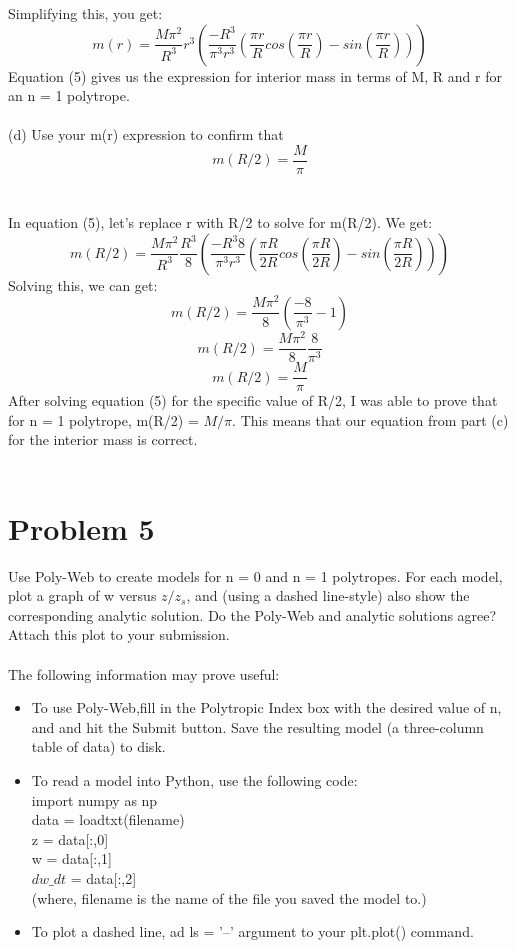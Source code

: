 \documentclass[10pt]{article}
\begin{document}
Simplifying this, you get:
\begin{equation}
    m(r) = \frac{M \pi^2}{R^3} r^3 \left( \frac{-R^3}{\pi^3 r^3} \left( \frac{\pi r }{R} cos(\frac{\pi r}{R}) - sin(\frac{\pi r}{R})\right) \right) \tag{5}
\end{equation}
Equation (5) gives us the expression for interior mass in terms of M, R and r for an n = 1 polytrope.
\\ \\
(d) Use your m(r) expression to confirm that 
\[ m(R/2) =  \frac{M}{\pi}\] \\ \\
In equation (5), let's replace r with R/2 to solve for m(R/2). We get:
\[ m(R/2) = \frac{M \pi^2}{R^3} \frac{R^3}{8} \left( \frac{-R^3 8}{\pi^3 r^3} \left( \frac{\pi R }{2R} cos(\frac{\pi R}{2R}) - sin(\frac{\pi R}{2R})\right) \right)\]
Solving this, we can get:
\[ m(R/2) = \frac{M \pi^2}{8} \left( \frac{-8}{\pi^3} -1\right)\]
\[ m(R/2) = \frac{M \pi^2}{8} \frac{8}{\pi^3}\]
\[ m(R/2) = \frac{M}{\pi}\]
After solving equation (5) for the specific value of R/2, I was able to prove that for n = 1 polytrope, m(R/2) = $M/\pi$. This means that our equation from part (c) for the interior mass is correct.
\\ \\
\section*{Problem 5}
Use Poly-Web to create models for n = 0 and n = 1 polytropes. For each model, plot a graph of w versus $z/z_{s}$, and (using a dashed line-style) also show the corresponding analytic solution. Do the Poly-Web and analytic solutions agree? Attach this plot to your submission. \\ \\
The following information may prove useful:\\
\begin{itemize}
    \item To use Poly-Web,fill in the Polytropic Index box with the desired value of n, and and hit the Submit button. Save the resulting model (a three-column table of data) to disk.
    \item To read a model into Python, use the following code:\\
    import numpy as np\\
    data = loadtxt(filename)\\
    z = data[:,0]\\
    w = data[:,1]\\
    $dw\_dt$ = data[:,2]\\
    (where, filename is the name of the file you saved the model to.)
    \item To plot a dashed line, ad ls = '--' argument to your plt.plot() command.
\end{itemize}
\end{document}
